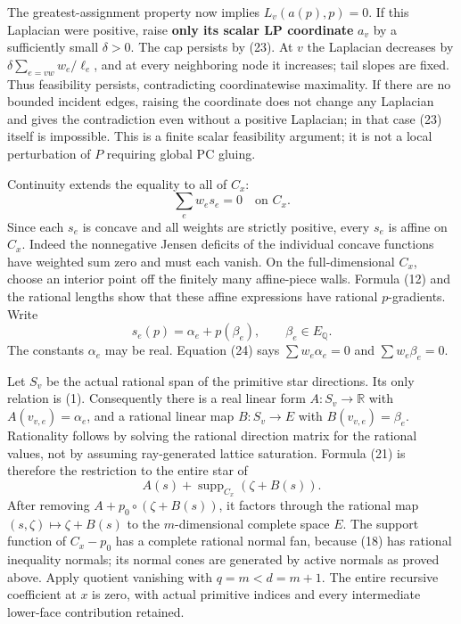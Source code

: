 \documentclass[
  11pt,
]{article}
\begin{document}
The greatest-assignment property now implies \(L_v(a(p),p)=0\). If this
Laplacian were positive, raise \textbf{only its scalar LP coordinate}
\(a_v\) by a sufficiently small \(\delta>0\). The cap persists by (23).
At \(v\) the Laplacian decreases by \(\delta\sum_{e=vw}w_e/\ell_e\), and
at every neighboring node it increases; tail slopes are fixed. Thus
feasibility persists, contradicting coordinatewise maximality. If there
are no bounded incident edges, raising the coordinate does not change
any Laplacian and gives the contradiction even without a positive
Laplacian; in that case (23) itself is impossible. This is a finite
scalar feasibility argument; it is not a local perturbation of \(P\)
requiring global PC gluing.

Continuity extends the equality to all of \(C_x\): \[
                              \sum_e w_es_e=0\quad\text{on }C_x.           \tag{24}
\] Since each \(s_e\) is concave and all weights are strictly positive,
every \(s_e\) is affine on \(C_x\). Indeed the nonnegative Jensen
deficits of the individual concave functions have weighted sum zero and
must each vanish. On the full-dimensional \(C_x\), choose an interior
point off the finitely many affine-piece walls. Formula (12) and the
rational lengths show that these affine expressions have rational
\(p\)-gradients. Write \[
                    s_e(p)=\alpha_e+p(\beta_e),\qquad\beta_e\in E_{\mathbb{Q}}.
                                                                         \tag{25}
\] The constants \(\alpha_e\) may be real. Equation (24) says
\(\sum w_e\alpha_e=0\) and \(\sum w_e\beta_e=0\).

Let \(S_v\) be the actual rational span of the primitive star
directions. Its only relation is (1). Consequently there is a real
linear form \(A:S_v\to\mathbb{R}\) with \(A(v_{v,e})=\alpha_e\), and a
rational linear map \(B:S_v\to E\) with \(B(v_{v,e})=\beta_e\).
Rationality follows by solving the rational direction matrix for the
rational values, not by assuming ray-generated lattice saturation.
Formula (21) is therefore the restriction to the entire star of \[
                       A(s)+\operatorname{supp}_{C_x}(\zeta+B(s)).        \tag{26}
\] After removing \(A+p_0\circ(\zeta+B(s))\), it factors through the
rational map \((s,\zeta)\mapsto\zeta+B(s)\) to the \(m\)-dimensional
complete space \(E\). The support function of \(C_x-p_0\) has a complete
rational normal fan, because (18) has rational inequality normals; its
normal cones are generated by active normals as proved above. Apply
quotient vanishing with \(q=m<d=m+1\). The entire recursive coefficient
at \(x\) is zero, with actual primitive indices and every intermediate
lower-face contribution retained.
\end{document}
